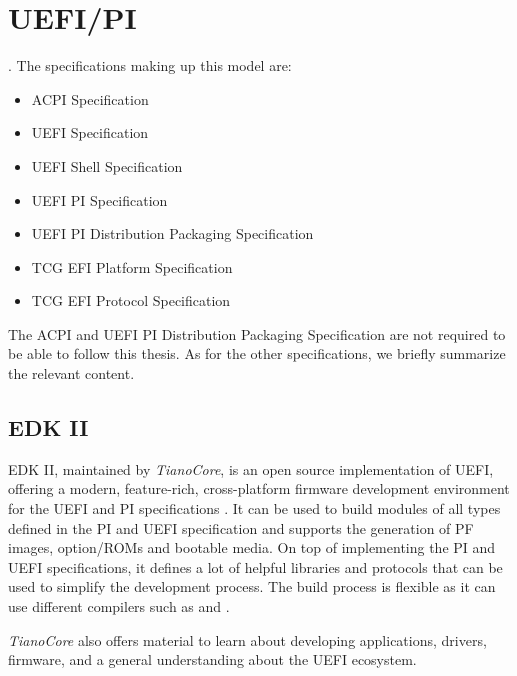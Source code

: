 
\chapter{\acs{UEFI}/\acs{PI}}

.
The specifications making up this model are:

\begin{itemize}
    \item \acs{ACPI} Specification
    \item \acs{UEFI} Specification
    \item \acs{UEFI} Shell Specification
    \item \acs{UEFI} \acs{PI} Specification
    \item \acs{UEFI} \acs{PI} Distribution Packaging Specification
    \item \acs{TCG} \acs{EFI} Platform Specification
    \item \acs{TCG} \acs{EFI} Protocol Specification
\end{itemize}

The \ac{ACPI} and \ac{UEFI} \ac{PI} Distribution Packaging Specification are not required to be able to follow this thesis.
As for the other specifications, we briefly summarize the relevant content.


\clearpage


\clearpage


\clearpage


\section{\acs{EDK} II}

\ac{EDK} II, maintained by \emph{TianoCore}, is an open source implementation of \ac{UEFI}, offering a modern, feature-rich, cross-platform firmware development environment for the \ac{UEFI} and \ac{PI} specifications \cite{tianocore}.
It can be used to build modules of all types defined in the \ac{PI} and \ac{UEFI} specification and supports the generation of \ac{PF} images, option\-/\acp{ROM} and bootable media.
On top of implementing the \ac{PI} and \ac{UEFI} specifications, it defines a lot of helpful libraries and protocols that can be used to simplify the development process.
The build process is flexible as it can use different compilers such as  and .

\emph{TianoCore} also offers material to learn about developing applications, drivers, firmware, and a general understanding about the \ac{UEFI} ecosystem.